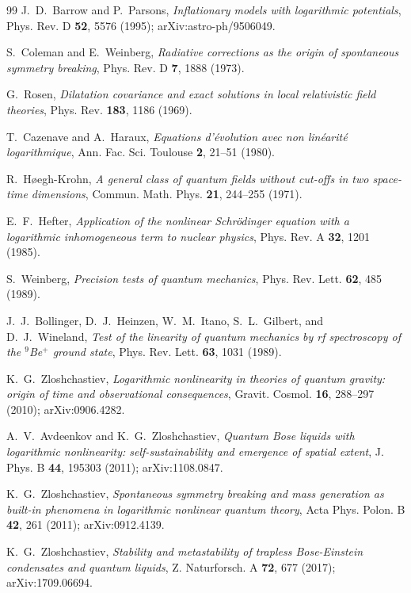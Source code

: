\documentclass[11pt,reqno]{amsart}
\theoremstyle{plain}
\theoremstyle{definition}
\theoremstyle{remark}
\begin{document}
\begin{thebibliography}{99}
J.~D.~Barrow and P.~Parsons,
\emph{Inflationary models with logarithmic potentials},
Phys. Rev. D \textbf{52}, 5576 (1995); arXiv:astro-ph/9506049.

S.~Coleman and E.~Weinberg,
\emph{Radiative corrections as the origin of spontaneous symmetry breaking},
Phys. Rev. D \textbf{7}, 1888 (1973).

G.~Rosen,
\emph{Dilatation covariance and exact solutions in local relativistic field theories},
Phys. Rev. \textbf{183}, 1186 (1969).

T.~Cazenave and A.~Haraux,
\emph{Equations d'\'evolution avec non lin\'earit\'e logarithmique},
Ann. Fac. Sci. Toulouse \textbf{2}, 21--51 (1980).

R.~H\o egh-Krohn,
\emph{A general class of quantum fields without cut-offs in two space-time dimensions},
Commun. Math. Phys. \textbf{21}, 244--255 (1971).

E.~F.~Hefter,
\emph{Application of the nonlinear Schr\"{o}dinger equation with a logarithmic
inhomogeneous term to nuclear physics},
Phys. Rev. A \textbf{32}, 1201 (1985).

S.~Weinberg,
\emph{Precision tests of quantum mechanics},
Phys. Rev. Lett. \textbf{62}, 485 (1989).

J.~J.~Bollinger, D.~J.~Heinzen, W.~M.~Itano, S.~L.~Gilbert, and D.~J.~Wineland,
\emph{Test of the linearity of quantum mechanics by rf spectroscopy of the
$^{9}$Be$^{+}$ ground state},
Phys. Rev. Lett. \textbf{63}, 1031 (1989).

K.~G.~Zloshchastiev,
\emph{Logarithmic nonlinearity in theories of quantum gravity: origin of time
and observational consequences},
Gravit. Cosmol. \textbf{16}, 288--297 (2010); arXiv:0906.4282.

A.~V.~Avdeenkov and K.~G.~Zloshchastiev,
\emph{Quantum Bose liquids with logarithmic nonlinearity: self-sustainability
and emergence of spatial extent},
J. Phys. B \textbf{44}, 195303 (2011); arXiv:1108.0847.

K.~G.~Zloshchastiev,
\emph{Spontaneous symmetry breaking and mass generation as built-in phenomena
in logarithmic nonlinear quantum theory},
Acta Phys. Polon. B \textbf{42}, 261 (2011); arXiv:0912.4139.

K.~G.~Zloshchastiev,
\emph{Stability and metastability of trapless Bose-Einstein condensates and
quantum liquids},
Z. Naturforsch. A \textbf{72}, 677 (2017); arXiv:1709.06694.


\end{thebibliography}
\end{document}
